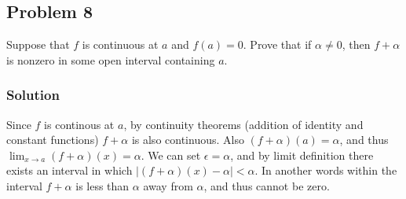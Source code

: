 \subsection*{Problem 8}
Suppose that $f$ is continuous at $a$ and $f(a)=0$. Prove that if $\alpha\neq 0$, then $f+\alpha$ is nonzero in some open interval containing $a$.

\subsubsection*{Solution}
Since $f$ is continous at $a$, by continuity theorems (addition of
identity and constant functions) $f+\alpha$ is also continuous. Also
$(f+\alpha)(a)=\alpha$, and thus $\lim_{x\to a}(f+\alpha)(x)=\alpha$. We can set
$\epsilon=\alpha$, and by limit definition there exists an interval in which
$|(f+\alpha)(x)-\alpha|<\alpha$. In another words within the interval $f+\alpha$ is less
than $\alpha$ away from $\alpha$, and thus cannot be zero.

